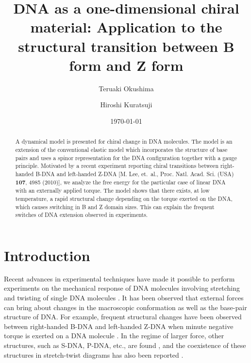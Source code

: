 \documentclass[pre,showpacs,twocolumn,superscriptaddress]{revtex4}
\begin{document}
\title{
DNA as a one-dimensional chiral material: Application to the 
structural transition between B form and Z form
}
\author{Teruaki Okushima}
\author{Hiroshi Kuratsuji}


\date{\today}
\begin{abstract} 
A dynamical model is presented for chiral change in DNA molecules.  
The model is an extension of the conventional elastic model which
incorporates the structure of base pairs and uses a spinor representation for the DNA configuration 
together with a gauge principle.  
Motivated by a recent experiment 
reporting chiral transitions between right-handed B-DNA and left-handed
 Z-DNA
[M. Lee, et.~al., Proc. Natl. Acad. Sci. (USA) {\bf 107}, 4985 (2010)],
we analyze the free energy for the particular case of linear DNA with an
 externally applied torque.
The model shows that there exists, at low temperature,
 a rapid structural change depending on the torque exerted on the DNA, 
which causes switching in B and Z domain sizes. 
This can explain the frequent switches of DNA extension observed in experiments.
\end{abstract}

\maketitle

\section{Introduction}
Recent advances in experimental techniques have made it possible to
perform experiments on the 
mechanical response of DNA molecules involving stretching and twisting of single DNA 
molecules \cite{recentReviewStrick,recentReviewMarko}. 
It has been observed that external forces can bring about changes in the macroscopic 
conformation as well as the base-pair structure of DNA. 
For example, frequent structural changes have been observed between right-handed 
B-DNA and left-handed Z-DNA when minute negative torque is exerted on a DNA molecule 
\cite{BZtrans}.
 In the regime of larger force, other structures, such as S-DNA, P-DNA, etc., are 
found \cite{tenYears}, and the coexistence of these structures in stretch-twist diagrams 
has also been reported \cite{structureTransition}.
\end{document}
